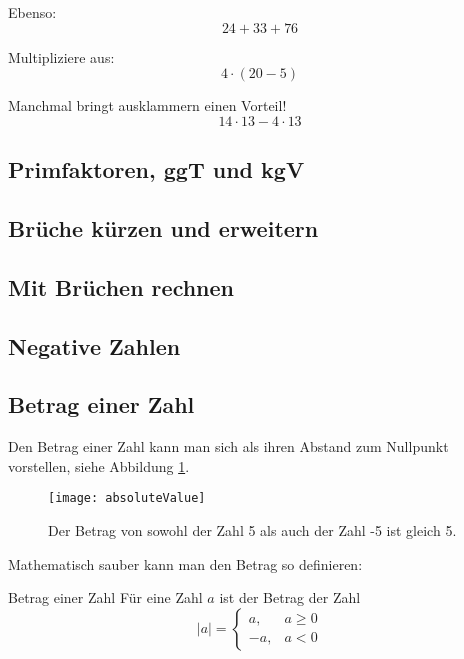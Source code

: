 \begin{example}
Ebenso:
\[
	24+33+76
\]
\end{example}

\begin{example}
Multipliziere aus:
\[
	4\cdot (20-5)
\]
\end{example}

\begin{example}
Manchmal bringt ausklammern einen Vorteil!
\[
	14\cdot 13 - 4\cdot 13
\]
\end{example}

\subsection{Primfaktoren, ggT und kgV}

\subsection{Brüche kürzen und erweitern}

\subsection{Mit Brüchen rechnen}

\subsection{Negative Zahlen}

\subsection{Betrag einer Zahl}

Den Betrag einer Zahl kann man sich als ihren Abstand zum Nullpunkt vorstellen, siehe Abbildung \ref{fig:absoluteValue}.
\begin{figure}[H]
 \vspace{.5cm}
 \centering
 \texttt{[image: absoluteValue]}
 \caption{Der Betrag von sowohl der Zahl 5 als auch der Zahl -5 ist gleich 5.}
 \label{fig:absoluteValue}
 \vspace{.5cm}
\end{figure}

Mathematisch sauber kann man den Betrag so definieren:

\begin{defn}{Betrag einer Zahl}
		Für eine Zahl $a$ ist der Betrag der Zahl
		\[
			|a|=\left\{\begin{array}{ll} a, & a\ge 0 \\
		 -a, & a<0\end{array}\right.
		\]
\end{defn}

